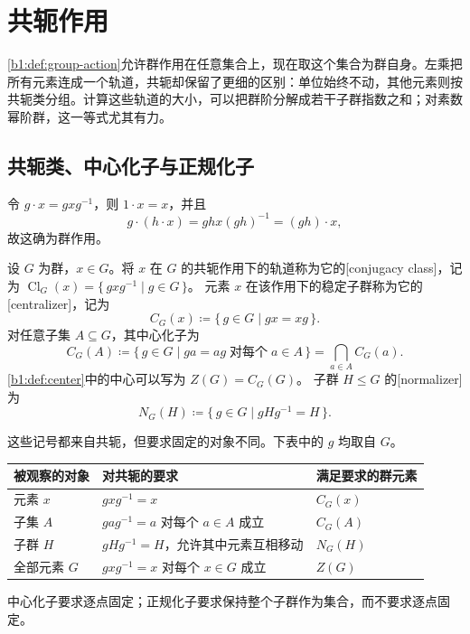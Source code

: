 
\section{共轭作用}
\label{b1:sec:0402}

\cref{b1:def:group-action}允许群作用在任意集合上，现在取这个集合为群自身。左乘把所有元素连成一个轨道，共轭却保留了更细的区别：单位始终不动，其他元素则按共轭类分组。计算这些轨道的大小，可以把群阶分解成若干子群指数之和；对素数幂阶群，这一等式尤其有力。


%
%

\subsection{共轭类、中心化子与正规化子}
\label{b1:subsec:0402:01}

令 \(g\cdot x=gxg^{-1}\)，则 \(1\cdot x=x\)，并且
\[
	g\cdot(h\cdot x)=ghx(gh)^{-1}=(gh)\cdot x,
\]
故这确为群作用。

\begin{definition}\label{b1:def:centralizer-normalizer}
	设 \(G\) 为群，\(x\in G\)。将 \(x\) 在 \(G\) 的共轭作用下的轨道称为它的[conjugacy class]，记为 \(\operatorname{Cl}_G(x)=\{\,gxg^{-1}\mid g\in G\,\}\)。 元素 \(x\) 在该作用下的稳定子群称为它的[centralizer]，记为
	\[
		C_G(x)\coloneqq\{\,g\in G\mid gx=xg\,\}.
	\]
	对任意子集 \(A\subseteq G\)，其中心化子为
	\[
		C_G(A)\coloneqq\{\,g\in G\mid ga=ag\;\text{对每个}\;a\in A\,\} =\bigcap_{a\in A}C_G(a).
	\]
	\cref{b1:def:center}中的中心可以写为 \(Z(G)=C_G(G)\)。 子群 \(H\leq G\) 的[normalizer]为
	\[
		N_G(H)\coloneqq\{\,g\in G\mid gHg^{-1}=H\,\}.
	\]
\end{definition}

这些记号都来自共轭，但要求固定的对象不同。下表中的 \(g\) 均取自 \(G\)。
\begin{center}
	\begin{tabularx}{\linewidth}{@{}lXl@{}}
		\toprule
		被观察的对象 & 对共轭的要求 & 满足要求的群元素 \\
		\midrule
		元素 \(x\) & \(gxg^{-1}=x\) & \(C_G(x)\) \\
		子集 \(A\) & \(gag^{-1}=a\) 对每个 \(a\in A\) 成立 & \(C_G(A)\) \\
		子群 \(H\) & \(gHg^{-1}=H\)，允许其中元素互相移动 & \(N_G(H)\) \\
		全部元素 \(G\) & \(gxg^{-1}=x\) 对每个 \(x\in G\) 成立 & \(Z(G)\) \\
		\bottomrule
	\end{tabularx}
\end{center}
中心化子要求逐点固定；正规化子要求保持整个子群作为集合，而不要求逐点固定。

